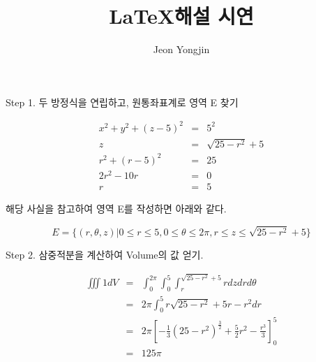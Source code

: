 \documentclass{article}
\author{Jeon Yongjin}
\title{\LaTeX 해설 시연}
\date{}
\begin{document}
\maketitle

Step 1. 두 방정식을 연립하고, 원통좌표계로 영역 E 찾기

\begin{eqnarray*}
    x^2 + y^2 + (z-5)^2 &=& 5^2 \\
    z &=& \sqrt{25 - r^2} + 5 \\
    r^2 + (r-5)^2 &=& 25 \\
    2r^2 - 10r &=& 0 \\
    r &=& 5
\end{eqnarray*}

해당 사실을 참고하여 영역 E를 작성하면 아래와 같다.

\[E  = \{ (r,\theta,z) | 0 \leq r \leq 5, 0 \leq \theta \leq 2\pi, r \leq z \leq \sqrt{25-r^2}+5 \}\]

Step 2. 삼중적분을 계산하여 Volume의 값 얻기.

\begin{eqnarray*}
    \iiint 1 dV &=& \int_{0}^{2\pi} \int_{0}^{5} \int_{r}^{\sqrt{25-r^2}+5} r dz dr d\theta \\
    &=& 2\pi \int_{0}^{5} r\sqrt{25-r^2} + 5r -r^2 dr \\
    &=& 2\pi \left[ -\frac{1}{3}(25-r^2)^{\frac{3}{2}} + \frac{5}{2}r^2 - \frac{r^3}{3} \right]_{0}^{5} \\
    &=& 125\pi
\end{eqnarray*}
\end{document}
